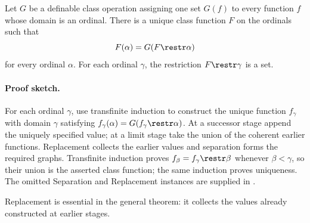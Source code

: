 \begin{theorem}
Let \(G\) be a definable class operation assigning one set \(G(f)\) to every
function \(f\) whose domain is an ordinal.  There is a unique class function
\(F\) on the ordinals such that
\[
  F(\alpha)=G(F\restr\alpha)
\]
for every ordinal \(\alpha\).  For each ordinal \(\gamma\), the restriction
\(F\restr\gamma\) is a set.
\end{theorem}

\paragraph{Proof sketch.}
For each ordinal \(\gamma\), use transfinite induction to construct the unique
function \(f_\gamma\) with domain \(\gamma\) satisfying
\(f_\gamma(\alpha)=G(f_\gamma\restr\alpha)\).  At a successor stage append
the uniquely specified value; at a limit stage take the union of the coherent
earlier functions.  Replacement collects the earlier values and separation
forms the required graphs.  Transfinite induction proves
\(f_\beta=f_\gamma\restr\beta\) whenever \(\beta<\gamma\), so their union is
the asserted class function; the same induction proves uniqueness.  The
omitted Separation and Replacement instances are supplied in
\cite[Chapter 2]{Jech2003}.

Replacement is essential in the general theorem: it collects the values
already constructed at earlier stages.

